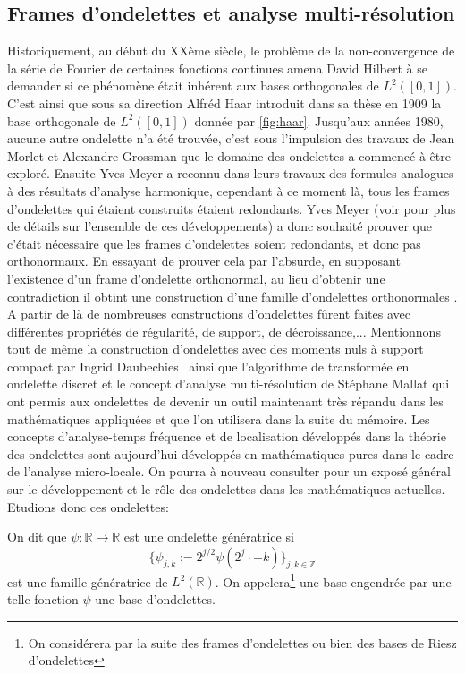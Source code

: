 \subsection{Frames d'ondelettes et analyse multi-résolution}\label{sec:frameondelette}
Historiquement, au début du XXème siècle, le problème de la non-convergence de la série de Fourier de certaines fonctions continues amena David Hilbert à se demander si ce phénomène était inhérent aux bases orthogonales de $L^2([0,1])$.
C'est ainsi que sous sa direction Alfréd Haar introduit dans sa thèse \cite{haar} en 1909 la base orthogonale de $L^2([0,1])$ donnée par \ref{fig:haar}.
Jusqu'aux années 1980, aucune autre ondelette n'a été trouvée, c'est sous l'impulsion des travaux de Jean Morlet et Alexandre Grossman que le domaine des ondelettes a commencé à être exploré.
Ensuite Yves Meyer a reconnu dans leurs travaux des formules analogues à des résultats d'analyse harmonique, cependant à ce moment là, tous les frames d'ondelettes qui étaient construits étaient redondants.
Yves Meyer (voir \cite{daubpers} pour plus de détails sur l'ensemble de ces développements) a donc souhaité prouver que c'était nécessaire que les frames d'ondelettes soient redondants, et donc pas orthonormaux.
En essayant de prouver cela par l'absurde, en supposant l'existence d'un frame d'ondelette orthonormal, au lieu d'obtenir une contradiction il obtint une construction d'une famille d'ondelettes orthonormales \cite{meyer}.
A partir de là de nombreuses constructions d'ondelettes fûrent faites avec différentes propriétés de régularité, de support, de décroissance,... 
Mentionnons tout de même la construction d'ondelettes avec des moments nuls à support compact par Ingrid Daubechies \cite{daubbook} ainsi que l'algorithme de transformée en ondelette discret et le concept d'analyse multi-résolution de Stéphane Mallat \cite{mallatbook} qui ont permis aux ondelettes de devenir un outil maintenant très répandu dans les mathématiques appliquées et que l'on utilisera dans la suite du mémoire.
Les concepts d'analyse-temps fréquence et de localisation développés dans la théorie des ondelettes sont aujourd'hui développés en mathématiques pures dans le cadre de l'analyse micro-locale. On pourra à nouveau consulter \cite{jaffardondelettes} pour un exposé général sur le développement et le rôle des ondelettes dans les mathématiques actuelles.
\newline
Etudions donc ces ondelettes:
\begin{definition}
	On dit que $\psi:\mathbb{R} \to \mathbb{R}$ est une ondelette génératrice si 
	\begin{equation}
		\{\psi_{j,k} := 2^{j/2}\psi(2^j\cdot - k)\}_{j,k \in \mathbb{Z}}
	\end{equation}
	est une famille génératrice de $L^2(\mathbb{R})$.
	On appelera\footnote{On considérera par la suite des frames d'ondelettes ou bien des bases de Riesz d'ondelettes} une base engendrée par une telle fonction $\psi$ une base d'ondelettes.
\end{definition}
